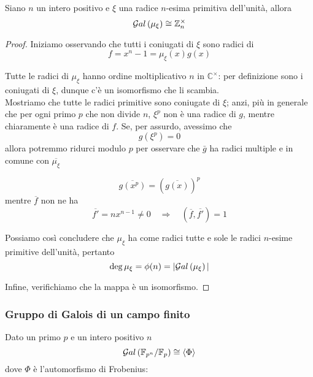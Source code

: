 \begin{multicols}{2}
	\begin{theorem}
		Siano $ n $ un intero positivo e $ \xi $ una radice $ n $-esima primitiva dell'unità, allora
		\[ \mathcal{G}al\left( \mu_{\xi} \right) \cong \mathbb{Z}_n^\times \]
	\end{theorem}
	
	\begin{proof}
		Iniziamo osservando che tutti i coniugati di $ \xi $ sono radici di
		\[ f = x^n -1 = \mu_\xi (x)  g(x)\]
		
		
		Tutte le radici di $ \mu_\xi $ hanno ordine moltiplicativo $ n $ in $ \mathbb{C}^\times $: per definizione sono i coniugati di $ \xi $, dunque c'è un isomorfismo che li scambia.\\
		
		Mostriamo che tutte le radici primitive sono coniugate di $ \xi $; anzi, più in generale che per ogni primo $ p $ che non divide $ n $, $ \xi^p $ non è una radice di $ g $, mentre chiaramente è una radice di $ f $. Se, per assurdo, avessimo che
		\[ g(\xi^p) = 0 \]
		allora potremmo ridurci modulo $ p $ per osservare che $ \bar{g} $ ha radici multiple e in comune con $ \overline{\mu_\xi} $
		
		\[ \overline{g(x^p)} = \left(\overline{g(x)}\right)^p \]
		mentre $ \overline{f} $ non ne ha
		\[ \overline{f'} =  nx^{n-1} \neq 0 \quad\Rightarrow\quad (\overline{f}, \overline{f'}) = 1   \]
		
		Possiamo così concludere che $ \mu_\xi $ ha come radici tutte e sole le radici $ n $-esime primitive dell'unità, pertanto
		\[ \deg\mu_\xi = \phi(n) = |\mathcal{G}al\left( \mu_\xi \right)| \]
		
		
		Infine, verifichiamo che la mappa
		è un isomorfismo.
	\end{proof}
	
	
	
	\subsubsection{Gruppo di Galois di un campo finito}
	\begin{theorem}[Frobenius]
	Dato un primo $ p $ e un intero positivo $ n $
	\[ \mathcal{G}al\left( \mathbb{F}_{p^n} /\mathbb{F}_p \right) \cong \langle \Phi \rangle \]
	dove $ \Phi $ è l'automorfismo di Frobenius: 
	\end{theorem}
	

\end{multicols}
